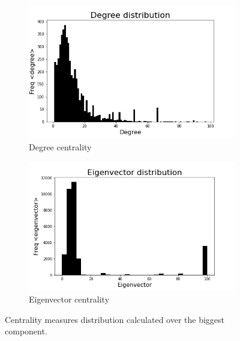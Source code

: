 \documentclass[sigchi]{acmart}
\begin{document}
\begin{figure}[]
\begin{subfigure}{.45\columnwidth}
  \centering
  \includegraphics[width=\columnwidth]{report/img/degr.png} 
  \caption{Degree centrality}
  \label{fig:sub-deg}
\end{subfigure}
\hfill
\begin{subfigure}{.45\columnwidth}
  \centering
  \includegraphics[width=\columnwidth]{report/img/eigen.png}
  \caption{Eigenvector centrality}
  \label{fig:sub-eig}
\end{subfigure}
\hfill
\label{fig:commCorrelation}
\caption{Centrality measures distribution calculated over the biggest component.}
\end{figure}
\end{document}
